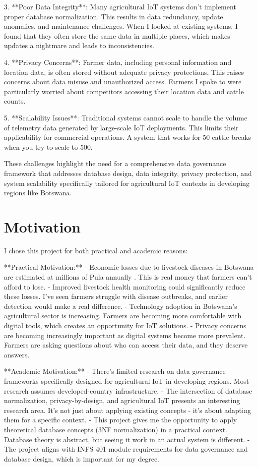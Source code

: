 3. **Poor Data Integrity**: Many agricultural IoT systems don't implement proper database normalization. This results in data redundancy, update anomalies, and maintenance challenges. When I looked at existing systems, I found that they often store the same data in multiple places, which makes updates a nightmare and leads to inconsistencies.

4. **Privacy Concerns**: Farmer data, including personal information and location data, is often stored without adequate privacy protections. This raises concerns about data misuse and unauthorized access. Farmers I spoke to were particularly worried about competitors accessing their location data and cattle counts.

5. **Scalability Issues**: Traditional systems cannot scale to handle the volume of telemetry data generated by large-scale IoT deployments. This limits their applicability for commercial operations. A system that works for 50 cattle breaks when you try to scale to 500.

These challenges highlight the need for a comprehensive data governance framework that addresses database design, data integrity, privacy protection, and system scalability specifically tailored for agricultural IoT contexts in developing regions like Botswana.

\section{Motivation}

I chose this project for both practical and academic reasons:

**Practical Motivation:**
- Economic losses due to livestock diseases in Botswana are estimated at millions of Pula annually \cite{botswana_livestock_2022}. This is real money that farmers can't afford to lose.
- Improved livestock health monitoring could significantly reduce these losses. I've seen farmers struggle with disease outbreaks, and earlier detection would make a real difference.
- Technology adoption in Botswana's agricultural sector is increasing. Farmers are becoming more comfortable with digital tools, which creates an opportunity for IoT solutions.
- Privacy concerns are becoming increasingly important as digital systems become more prevalent. Farmers are asking questions about who can access their data, and they deserve answers.

**Academic Motivation:**
- There's limited research on data governance frameworks specifically designed for agricultural IoT in developing regions. Most research assumes developed-country infrastructure.
- The intersection of database normalization, privacy-by-design, and agricultural IoT presents an interesting research area. It's not just about applying existing concepts - it's about adapting them for a specific context.
- This project gives me the opportunity to apply theoretical database concepts (3NF normalization) in a practical context. Database theory is abstract, but seeing it work in an actual system is different.
- The project aligns with INFS 401 module requirements for data governance and database design, which is important for my degree.

